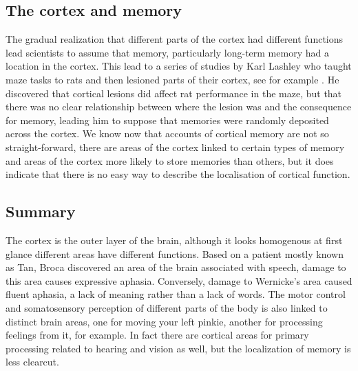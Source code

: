 \documentclass[12pt]{article}
\begin{document}
\subsection*{The cortex and memory}

The gradual realization that different parts of the cortex had
different functions lead scientists to assume that memory,
particularly long-term memory had a location in the cortex. This lead
to a series of studies by Karl Lashley who taught maze tasks to rats
and then lesioned parts of their cortex, see for example
\cite{Lashley1950}. He discovered that cortical lesions did affect rat
performance in the maze, but that there was no clear relationship
between where the lesion was and the consequence for memory, leading
him to suppose that memories were randomly deposited across the
cortex. We know now that accounts of cortical memory are not so
straight-forward, there are areas of the cortex linked to certain
types of memory and areas of the cortex more likely to store memories
than others, but it does indicate that there is no easy way to
describe the localisation of cortical function.

\subsection*{Summary}

The cortex is the outer layer of the brain, although it looks
homogenous at first glance different areas have different
functions. Based on a patient mostly known as Tan, Broca discovered an
area of the brain associated with speech, damage to this area causes
expressive aphasia. Conversely, damage to Wernicke's area caused
fluent aphasia, a lack of meaning rather than a lack of words. The
motor control and somatosensory perception of different parts of the
body is also linked to distinct brain areas, one for moving your left
pinkie, another for processing feelings from it, for example. In fact
there are cortical areas for primary processing related to hearing and
vision as well, but the localization of memory is less clearcut.


{}
\end{document}
